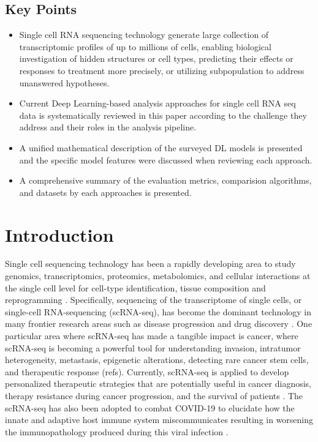 \documentclass[
]{book}
\providecommand{\tightlist}{%
  \setlength{\itemsep}{0pt}\setlength{\parskip}{0pt}}
\begin{document}
\hypertarget{key-points}{%
\section*{Key Points}\label{key-points}}

\begin{itemize}
\tightlist
\item
  Single cell RNA sequencing technology generate large collection of transcriptomic profiles of up to millions of cells, enabling biological investigation of hidden structures or cell types, predicting their effects or responses to treatment more precisely, or utilizing subpopulation to address unanswered hypotheses.
\item
  Current Deep Learning-based analysis approaches for single cell RNA seq data is systematically reviewed in this paper according to the challenge they address and their roles in the analysis pipeline.
\item
  A unified mathematical description of the surveyed DL models is presented and the specific model features were discussed when reviewing each approach.\\
\item
  A comprehensive summary of the evaluation metrics, comparision algorithms, and datasets by each approaches is presented.
\end{itemize}

\hypertarget{ch-1}{%
\chapter{Introduction}\label{ch-1}}

Single cell sequencing technology has been a rapidly developing area to study genomics, transcriptomics, proteomics, metabolomics, and cellular interactions at the single cell level for cell-type identification, tissue composition and reprogramming \citep{RN87, RN98} . Specifically, sequencing of the transcriptome of single cells, or single-cell RNA-sequencing (scRNA-seq), has become the dominant technology in many frontier research areas such as disease progression and drug discovery \citep{RN191, RN78} . One particular area where scRNA-seq has made a tangible impact is cancer, where scRNA-seq is becoming a powerful tool for understanding invasion, intratumor heterogeneity, metastasis, epigenetic alterations, detecting rare cancer stem cells, and therapeutic response (refs). Currently, scRNA-seq is applied to develop personalized therapeutic strategies that are potentially useful in cancer diagnosis, therapy resistance during cancer progression, and the survival of patients \citep{RN85, RN59}. The scRNA-seq has also been adopted to combat COVID-19 to elucidate how the innate and adaptive host immune system miscommunicates resulting in worsening the immunopathology produced during this viral infection \citep{RN91, RN99}.
\end{document}
